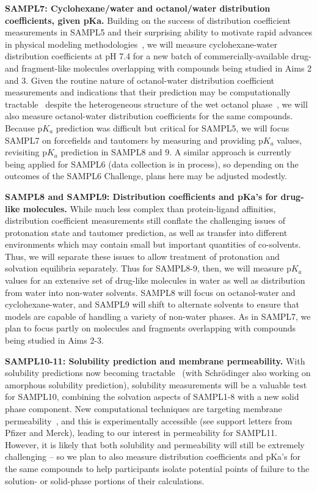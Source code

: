 \documentclass[11pt]{article}
\begin{document}
\textbf{SAMPL7: Cyclohexane/water and octanol/water distribution coefficients, given pKa.}
Building on the success of distribution coefficient measurements in SAMPL5 and their surprising ability to motivate rapid advances in physical modeling methodologies~\cite{Bannan:2016:JComputAidedMolDes}, we will measure cyclohexane-water distribution coefficients at pH 7.4 for a new batch of commercially-available drug- and fragment-like molecules overlapping with compounds being studied in Aims 2 and 3.
Given the routine nature of octanol-water distribution coefficient measurements and indications that their prediction may be computationally tractable~\cite{Bhatnagar:2013:PhysicalChemistryChemicalPhysics, bannan_calculating_2016} despite the heterogeneous structure of the wet octanol phase~\cite{Kollman:1996:AccountsofChemicalResearch}, we will also measure octanol-water distribution coefficients for the same compounds.
Because p$K_a$ prediction was difficult but critical for SAMPL5, we will focus SAMPL7 on forcefields and tautomers by measuring and providing p$K_a$ values, revisiting p$K_a$ prediction in SAMPL8 and 9.
A similar approach is currently being applied for SAMPL6 (data collection is in process), so depending on the outcomes of the SAMPL6 Challenge, plans here may be adjusted modestly.

\textbf{SAMPL8 and SAMPL9: Distribution coefficients and pKa's for drug-like molecules.} 
While much less complex than protein-ligand affinities, distribution coefficient measurements still conflate the challenging issues of protonation state and tautomer prediction, as well as transfer into different environments which may contain small but important quantities of co-solvents. 
Thus, we will separate these issues to allow treatment of protonation and solvation equilibria separately. 
Thus for SAMPL8-9, then, we will measure p$K_a$ values for an extensive set of drug-like molecules in water as well as distribution from water into non-water solvents.
SAMPL8 will focus on octanol-water and cyclohexane-water, and SAMPL9 will shift to alternate solvents to ensure that models are capable of handling a variety of non-water phases. 
As in SAMPL7, we plan to focus partly on molecules and fragments overlapping with compounds being studied in Aims 2-3.

\textbf{SAMPL10-11: Solubility prediction and membrane permeability.}
With solubility predictions now becoming tractable~\cite{Schnieders:2012:J.Chem.TheoryComput., park_absolute_2014, liu_using_2016} (with Schr\"{o}dinger also working on amorphous solubility prediction), solubility measurements will be a valuable test for SAMPL10, combining the solvation aspects of SAMPL1-8 with a new solid phase component.
New computational techniques are targeting membrane permeability~\cite{lee_permeability_2016, comer_permeability_2014}, and this is experimentally accessible (see support letters from Pfizer and Merck), leading to our interest in permeability for SAMPL11.
However, it is likely that both solubility and permeability will still be extremely challenging -- so we plan to also measure distribution coefficients and pKa's for the same compounds to help participants isolate potential points of failure to the solution- or solid-phase portions of their calculations.
\end{document}

